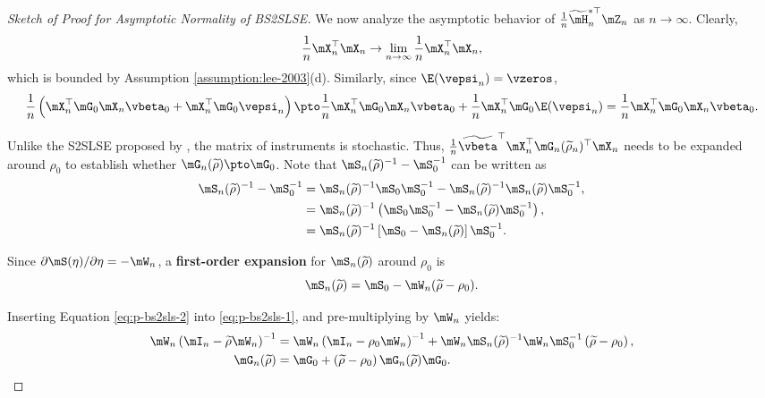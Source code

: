 \documentclass[english,12pt]{book}\usepackage[]{graphicx}\usepackage[]{xcolor}
\begin{document}
\begin{proof}[Sketch of Proof for Asymptotic Normality of BS2SLSE]
We now analyze the asymptotic behavior of $\frac{1}{n}\widetilde{\mH}^{*\top}_n \mZ_n$ as $n\to\infty$. Clearly, 
\begin{equation*}
 \frac{1}{n}\mX_n^\top\mX_n \to \lim_{n\to\infty}\frac{1}{n}\mX_n^\top\mX_n, 
\end{equation*}
%
which is bounded by Assumption \ref{assumption:lee-2003}(d). Similarly, since $\E(\vepsi_n) = \vzeros$,  
\begin{equation*}
\frac{1}{n}\left(\mX_n^\top\mG_0\mX_n\vbeta_0 + \mX_n^\top\mG_0\vepsi_n\right)\pto \frac{1}{n}\mX_n^\top\mG_0\mX_n\vbeta_0 + \frac{1}{n}\mX_n^\top\mG_0\E(\vepsi_n) = \frac{1}{n}\mX_n^\top\mG_0\mX_n\vbeta_0.
\end{equation*}

Unlike the S2SLSE proposed by \cite{kelejian1998generalized}, the matrix of instruments is stochastic. Thus,  $\frac{1}{n}\widetilde{\vbeta}^\top\mX_n^\top \mG_n(\widetilde{\rho}_n)^\top\mX_n$ needs to be expanded around $\rho_0$ to establish whether $\mG_n(\widetilde{\rho})\pto \mG_0$. Note that $\mS_n(\widetilde{\rho})^{-1} - \mS_0^{-1}$ can be written as
\begin{equation}\label{eq:p-bs2sls-1}
\begin{aligned}
\mS_n(\widetilde{\rho})^{-1} - \mS_0^{-1} & = \mS_n(\widetilde{\rho})^{-1}\mS_0\mS_0^{-1} - \mS_n(\widetilde{\rho})^{-1}\mS_n(\widetilde{\rho})\mS_0^{-1}, \\
    & = \mS_n(\widetilde{\rho})^{-1}\left(\mS_0\mS_0^{-1} - \mS_n(\widetilde{\rho})\mS_0^{-1}\right), \\
    & = \mS_n(\widetilde{\rho})^{-1}\left[\mS_0 - \mS_n(\widetilde{\rho})\right]\mS_0^{-1}.
\end{aligned}
\end{equation}

Since $\partial \mS(\eta) /\partial \eta = -\mW_n$, a \textbf{first-order expansion} for $\mS_n(\widetilde{\rho})$ around $\rho_0$ is
\begin{equation}\label{eq:p-bs2sls-2}
\mS_n(\widetilde{\rho}) = \mS_0 - \mW_n(\widetilde{\rho} - \rho_0).
\end{equation}

Inserting Equation \eqref{eq:p-bs2sls-2} into \eqref{eq:p-bs2sls-1}, and pre-multiplying by $\mW_n$ yields:
\begin{equation*}
\begin{aligned}
\mW_n\left(\mI_n - \widetilde{\rho}\mW_n\right)^{-1} & = \mW_n\left(\mI_n - \rho_0\mW_n\right)^{-1} + \mW_n\mS_n(\widetilde{\rho})^{-1}\mW_n\mS_0^{-1}\left(\widetilde{\rho} - \rho_0\right), \\
\mG_n(\widetilde{\rho}) & = \mG_0 + \left(\widetilde{\rho} - \rho_0\right)\mG_{n}(\widetilde{\rho})\mG_0.
\end{aligned}
\end{equation*}


\end{proof}
\end{document}
